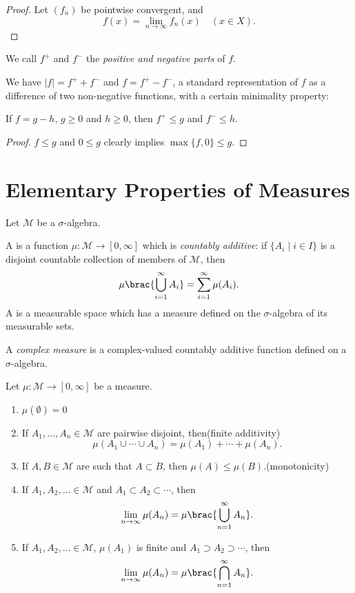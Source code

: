 \begin{proof}
Let $(f_n)$ be pointwise convergent, and
\[f(x)=\lim_{n\to\infty}f_n(x)\quad(x\in X).\]

\end{proof}

We call $f^+$ and $f^-$ the \emph{positive and negative parts} of $f$. 

We have $|f|=f^++f^-$ and $f=f^+-f^-$, a standard representation of $f$ as a difference of two non-negative functions, with a certain minimality property: 

\begin{lemma}
If $f=g-h$, $g\ge0$ and $h\ge0$, then $f^+\le g$ and $f^-\le h$.
\end{lemma}

\begin{proof}
$f\le g$ and $0\le g$ clearly implies $\max\{f,0\}\le g$. 
\end{proof}
\pagebreak

\section{Elementary Properties of Measures}
Let $\mathcal{M}$ be a $\sigma$-algebra.

\begin{definition}
A  is a function $\mu:\mathcal{M}\to[0,\infty]$ which is \emph{countably additive}: if $\{A_i\mid i\in I\}$ is a disjoint countable collection of members of $\mathcal{M}$, then
\[\mu\brac{\bigcup_{i=1}^{\infty}A_i}=\sum_{i=1}^{\infty}\mu(A_i).\]
A  is a measurable space which has a measure defined on the $\sigma$-algebra of its measurable sets.

A \emph{complex measure} is a complex-valued countably additive function defined on a $\sigma$-algebra. 
\end{definition}

\begin{lemma}
Let $\mu:\mathcal{M}\to[0,\infty]$ be a measure.
\begin{enumerate}[label=(\roman*)]
\item $\mu(\emptyset)=0$
\item If $A_1,\dots,A_n\in\mathcal{M}$ are pairwise disjoint, then\hfill(finite additivity)
\[\mu(A_1\cup\cdots\cup A_n)=\mu(A_1)+\cdots+\mu(A_n).\]
\item If $A,B\in\mathcal{M}$ are such that $A\subset B$, then $\mu(A)\le\mu(B)$.\hfill(monotonicity)
\item If $A_1,A_2,\dots\in\mathcal{M}$ and $A_1\subset A_2\subset\cdots$, then
\[\lim_{n\to\infty}\mu(A_n)=\mu\brac{\bigcup_{n=1}^{\infty}A_n}.\]
\item If $A_1,A_2,\dots\in\mathcal{M}$, $\mu(A_1)$ is finite and $A_1\supset A_2\supset\cdots$, then
\[\lim_{n\to\infty}\mu(A_n)=\mu\brac{\bigcap_{n=1}^{\infty}A_n}.\]
\end{enumerate}
\end{lemma}

